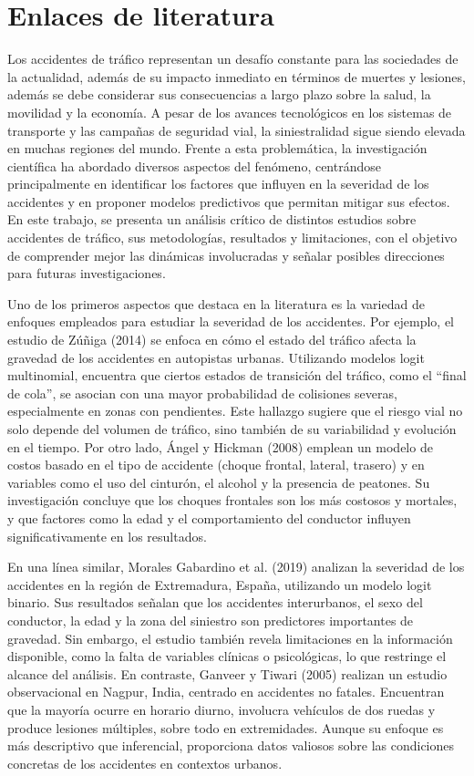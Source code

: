 \documentclass{book}
\begin{document}
\section{Enlaces de literatura}



Los accidentes de tráfico representan un desafío constante para las sociedades de la actualidad, además de su impacto inmediato en términos de muertes y lesiones, además se debe considerar sus consecuencias a largo plazo sobre la salud, la movilidad y la economía. A pesar de los avances tecnológicos en los sistemas de transporte y las campañas de seguridad vial, la siniestralidad sigue siendo elevada en muchas regiones del mundo. Frente a esta problemática, la investigación científica ha abordado diversos aspectos del fenómeno, centrándose principalmente en identificar los factores que influyen en la severidad de los accidentes y en proponer modelos predictivos que permitan mitigar sus efectos. En este trabajo, se presenta un análisis crítico de distintos estudios sobre accidentes de tráfico, sus metodologías, resultados y limitaciones, con el objetivo de comprender mejor las dinámicas involucradas y señalar posibles direcciones para futuras investigaciones.

Uno de los primeros aspectos que destaca en la literatura es la variedad de enfoques empleados para estudiar la severidad de los accidentes. Por ejemplo, el estudio de Zúñiga (2014) se enfoca en cómo el estado del tráfico afecta la gravedad de los accidentes en autopistas urbanas. Utilizando modelos logit multinomial, encuentra que ciertos estados de transición del tráfico, como el ``final de cola'', se asocian con una mayor probabilidad de colisiones severas, especialmente en zonas con pendientes. Este hallazgo sugiere que el riesgo vial no solo depende del volumen de tráfico, sino también de su variabilidad y evolución en el tiempo. Por otro lado, Ángel y Hickman (2008) emplean un modelo de costos basado en el tipo de accidente (choque frontal, lateral, trasero) y en variables como el uso del cinturón, el alcohol y la presencia de peatones. Su investigación concluye que los choques frontales son los más costosos y mortales, y que factores como la edad y el comportamiento del conductor influyen significativamente en los resultados.

En una línea similar, Morales Gabardino et al. (2019) analizan la severidad de los accidentes en la región de Extremadura, España, utilizando un modelo logit binario. Sus resultados señalan que los accidentes interurbanos, el sexo del conductor, la edad y la zona del siniestro son predictores importantes de gravedad. Sin embargo, el estudio también revela limitaciones en la información disponible, como la falta de variables clínicas o psicológicas, lo que restringe el alcance del análisis. En contraste, Ganveer y Tiwari (2005) realizan un estudio observacional en Nagpur, India, centrado en accidentes no fatales. Encuentran que la mayoría ocurre en horario diurno, involucra vehículos de dos ruedas y produce lesiones múltiples, sobre todo en extremidades. Aunque su enfoque es más descriptivo que inferencial, proporciona datos valiosos sobre las condiciones concretas de los accidentes en contextos urbanos.
\end{document}
